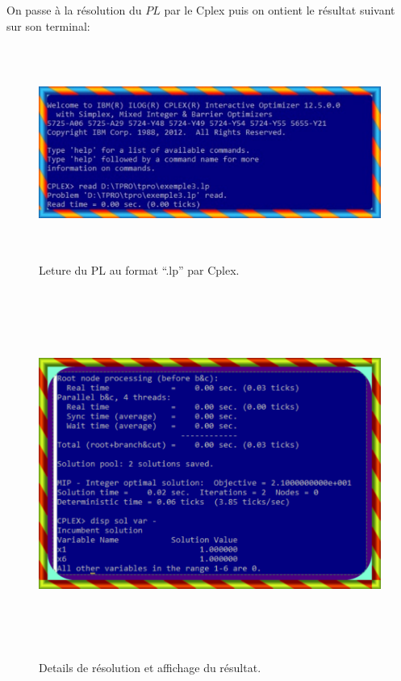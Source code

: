 \documentclass[a4paper,11pt,oneside]{report}
\theoremstyle{plain}
\newcommand{\0}{/ \! \! \! 0}
\theoremstyle{plain}
\begin{document}
On passe \`a la r\'esolution du $PL$ par le Cplex puis on ontient le r\'esultat suivant sur son terminal:
  \begin{figure}[]
  \begin{center}
  \includegraphics[height=7cm,width=16cm]{tp1}
  \caption{\label{fig2}Leture du PL au format ``.lp'' par Cplex.}
  \end{center}
  \end{figure}
 \begin{figure}[]
  \begin{center}
  \includegraphics[height=12cm,width=16cm]{tp2}
  \caption{\label{fig2} Details de r\'esolution et affichage du r\'esultat.}
  \end{center}
  \end{figure}
\end{document}
